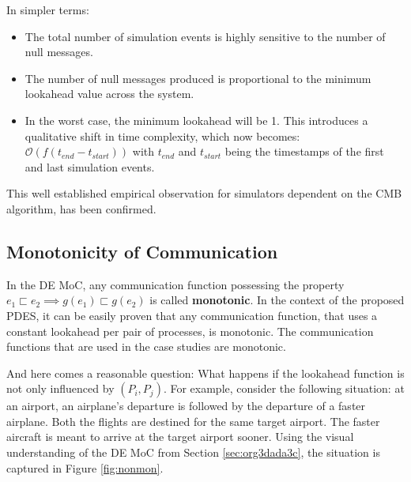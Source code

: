 \documentclass[11pt]{article}
\begin{document}
In simpler terms: 
\begin{itemize}
\item The total number of simulation events is highly sensitive to the number of null messages.
\item The number of null messages produced is proportional to the minimum lookahead value across the system.
\item In the worst case, the minimum lookahead will be 1. This introduces a qualitative shift in time complexity, which now becomes: 
\(\mathcal{O}(f(t_{end}-t_{start}))\) with \(t_{end}\) and \(t_{start}\) being the timestamps of the first and last simulation events.
\end{itemize}
This well established empirical observation \cite{Fujimoto1999} for simulators dependent on the CMB algorithm, has been confirmed.

\subsection{Monotonicity of Communication}
\label{sec:org5dbd9db}
In the DE MoC, any communication function possessing the property \(e_1 \sqsubset e_2 \implies g(e_1) \sqsubset g(e_2)\) is called \textbf{monotonic}.
In the context of the proposed PDES, it can be easily proven that any communication function, that uses a constant lookahead per pair of processes, is monotonic.
The communication functions that are used in the case studies are monotonic.

And here comes a reasonable question: What happens if the lookahead function is not only influenced by \((P_i, P_j)\).
For example, consider the following situation: 
at an airport, an airplane's departure is followed by the departure of a faster airplane.
Both the flights are destined for the same target airport.
The faster aircraft is meant to arrive at the target airport sooner.
Using the visual understanding of the DE MoC from Section \ref{sec:org3dada3c}, the situation is captured in Figure \ref{fig:nonmon}.
\end{document}
